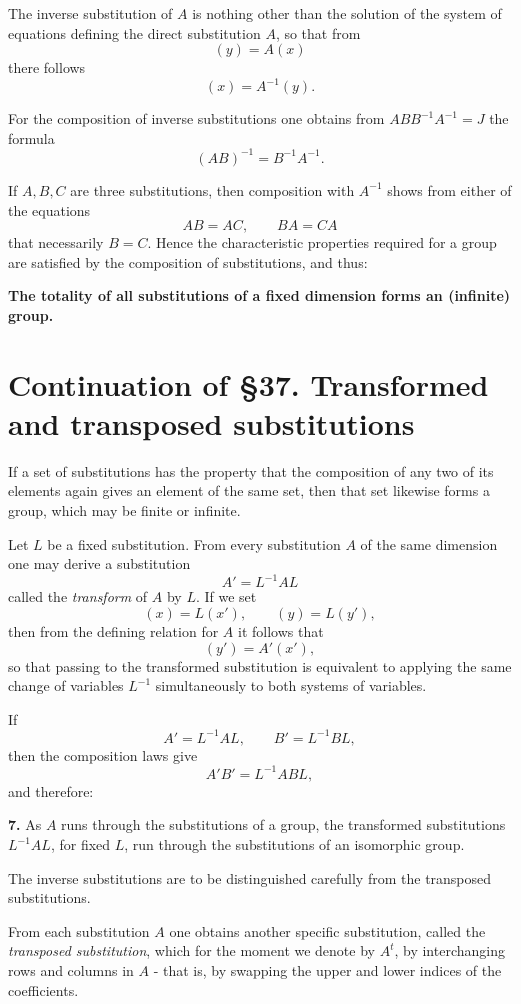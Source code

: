 \documentclass[11pt]{article}
\begin{document}
The inverse substitution of \(A\) is nothing other than the solution of the system of equations defining the direct substitution \(A\), so that from
\[
(y)=A(x)
\]
there follows
\[
(x)=A^{-1}(y).
\tag{19}
\]

For the composition of inverse substitutions one obtains from \(ABB^{-1}A^{-1}=J\) the formula
\[
(AB)^{-1}=B^{-1}A^{-1}.
\tag{20}
\]

If \(A,B,C\) are three substitutions, then composition with \(A^{-1}\) shows from either of the equations
\[
AB=AC,\qquad BA=CA
\]
that necessarily \(B=C\). Hence the characteristic properties required for a group are satisfied by the composition of substitutions, and thus:

\medskip
\noindent
\textbf{The totality of all substitutions of a fixed dimension forms an (infinite) group.}

\clearpage

\section*{Continuation of \S 37. Transformed and transposed substitutions}

If a set of substitutions has the property that the composition of any two of its elements again gives an element of the same set, then that set likewise forms a group, which may be finite or infinite.

Let $L$ be a fixed substitution. From every substitution $A$ of the same dimension one may derive a substitution
\[
A' = L^{-1}AL
\tag{21}
\]
called the \emph{transform} of $A$ by $L$.
If we set
\[
(x)=L(x'),\qquad (y)=L(y'),
\tag{22}
\]
then from the defining relation for $A$ it follows that
\[
(y') = A'(x'),
\tag{23}
\]
so that passing to the transformed substitution is equivalent to applying the same change of variables $L^{-1}$ simultaneously to both systems of variables.

If
\[
A' = L^{-1}AL,\qquad B' = L^{-1}BL,
\]
then the composition laws give
\[
A'B' = L^{-1}ABL,
\]
and therefore:

\medskip
\noindent\textbf{7.}
As $A$ runs through the substitutions of a group, the transformed substitutions $L^{-1}AL$, for fixed $L$, run through the substitutions of an isomorphic group.

\medskip
The inverse substitutions are to be distinguished carefully from the transposed substitutions.

From each substitution $A$ one obtains another specific substitution, called the \emph{transposed substitution}, which for the moment we denote by $A^{t}$, by interchanging rows and columns in $A$ - that is, by swapping the upper and lower indices of the coefficients.
\end{document}
